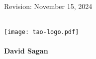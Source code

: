 \thispagestyle{empty}

\begin{flushright}
\large
Revision: November 15, 2024 \\
\end{flushright}

\vfill

{
\begin{center}
 \\
\vskip 0.2in
\texttt{[image: tao-logo.pdf]} \\
\vskip 0.3in
 \\
\vskip 0.4in
{\huge \sf\bf David Sagan} \\
\end{center}
}

\vfill
\break
